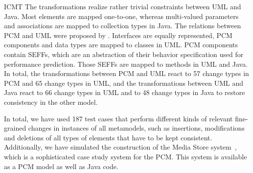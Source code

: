 \begin{copiedFrom}{ICMT}
The transformations realize rather trivial constraints between UML and Java.
Most elements are mapped one-to-one, whereas multi-valued parameters and associations are mapped to collection types in Java.
The relations between \ac{PCM} and UML were proposed by \textcite{langhammer2015a}.
Interfaces are equally represented, \ac{PCM} components and data types are mapped to classes in UML.
\ac{PCM} components contain \acp{SEFF}, which are an abstraction of their behavior specification used for performance prediction. 
Those \acp{SEFF} are mapped to methods in UML and Java.
In total, the transformations between \ac{PCM} and UML react to 57 change types in \ac{PCM} and 65 change types in UML, and the transformations between UML and Java react to 66 change types in UML and to 48 change types in Java to restore consistency in the other model.

In total, we have used 187 test cases that perform different kinds of relevant fine-grained changes in instances of all metamodels, such as insertions, modifications and deletions of all types of elements that have to be kept consistent.
Additionally, we have simulated the construction of the Media Store system~\cite{strittmatter2016a}, which is a sophisticated case study system for the \ac{PCM}.
This system is available as a \ac{PCM} model as well as Java code.


\end{copiedFrom}
